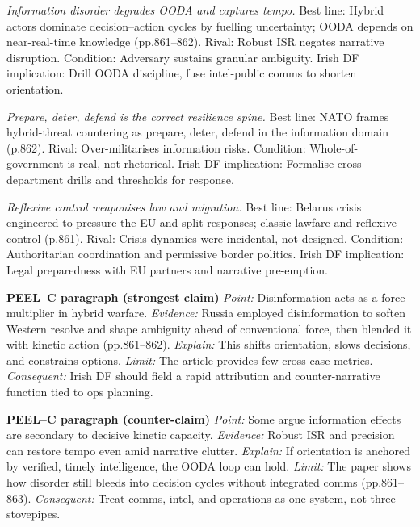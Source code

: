 \textit{Information disorder degrades OODA and captures tempo.} Best line: Hybrid actors dominate decision–action cycles by fuelling uncertainty; OODA depends on near-real-time knowledge (pp.861–862). Rival: Robust ISR negates narrative disruption. Condition: Adversary sustains granular ambiguity. Irish DF implication: Drill OODA discipline, fuse intel-public comms to shorten orientation.

\textit{Prepare, deter, defend is the correct resilience spine.} Best line: NATO frames hybrid-threat countering as prepare, deter, defend in the information domain (p.862). Rival: Over-militarises information risks. Condition: Whole-of-government is real, not rhetorical. Irish DF implication: Formalise cross-department drills and thresholds for response.

\textit{Reflexive control weaponises law and migration.} Best line: Belarus crisis engineered to pressure the EU and split responses; classic lawfare and reflexive control (p.861). Rival: Crisis dynamics were incidental, not designed. Condition: Authoritarian coordination and permissive border politics. Irish DF implication: Legal preparedness with EU partners and narrative pre-emption.

\textbf{PEEL–C paragraph (strongest claim)}
\textit{Point:} Disinformation acts as a force multiplier in hybrid warfare.
\textit{Evidence:} Russia employed disinformation to soften Western resolve and shape ambiguity ahead of conventional force, then blended it with kinetic action (pp.861–862).
\textit{Explain:} This shifts orientation, slows decisions, and constrains options.
\textit{Limit:} The article provides few cross-case metrics.
\textit{Consequent:} Irish DF should field a rapid attribution and counter-narrative function tied to ops planning.

\textbf{PEEL–C paragraph (counter-claim)}
\textit{Point:} Some argue information effects are secondary to decisive kinetic capacity.
\textit{Evidence:} Robust ISR and precision can restore tempo even amid narrative clutter.
\textit{Explain:} If orientation is anchored by verified, timely intelligence, the OODA loop can hold.
\textit{Limit:} The paper shows how disorder still bleeds into decision cycles without integrated comms (pp.861–863).
\textit{Consequent:} Treat comms, intel, and operations as one system, not three stovepipes.

